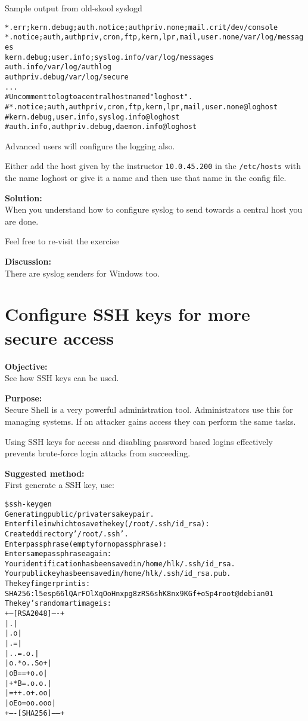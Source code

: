 \documentclass[a4paper,11pt,notitlepage]{report}
\begin{document}
Sample output from old-skool syslogd
\begin{alltt}
\small
*.err;kern.debug;auth.notice;authpriv.none;mail.crit    /dev/console
*.notice;auth,authpriv,cron,ftp,kern,lpr,mail,user.none /var/log/messages
kern.debug;user.info;syslog.info                        /var/log/messages
auth.info                                               /var/log/authlog
authpriv.debug                                          /var/log/secure
...
# Uncomment to log to a central host named "loghost".
#*.notice;auth,authpriv,cron,ftp,kern,lpr,mail,user.none        @loghost
#kern.debug,user.info,syslog.info                               @loghost
#auth.info,authpriv.debug,daemon.info                           @loghost
\end{alltt}

Advanced users will configure the logging also.

Either add the host given by the instructor \verb+10.0.45.200+ in the \verb+/etc/hosts+ with the name loghost or give it a name and then use that name in the config file.


{\bf Solution:}\\
When you understand how to configure syslog to send towards a central host you are done.

Feel free to re-visit the exercise 

{\bf Discussion:}\\
There are syslog senders for Windows too.


\chapter{Configure SSH keys for more secure access}
\label{ex:config-ssh-keys}

{\bf Objective:}\\
See how SSH keys can be used.

{\bf Purpose:}\\
Secure Shell is a very powerful administration tool. Administrators use this for managing systems. If an attacker gains access they can perform the same tasks.

Using SSH keys for access and disabling password based logins effectively prevents brute-force login attacks from succeeding.

{\bf Suggested method:}\\
First generate a SSH key, use:

\begin{alltt}
\$ ssh-keygen
Generating public/private rsa key pair.
Enter file in which to save the key (/root/.ssh/id_rsa):
Created directory '/root/.ssh'.
Enter passphrase (empty for no passphrase):
Enter same passphrase again:
Your identification has been saved in /home/hlk/.ssh/id_rsa.
Your public key has been saved in /home/hlk/.ssh/id_rsa.pub.
The key fingerprint is:
SHA256:l5esp66lQArFOlXqOoHnxpg8zRS6shK8nx9KGf+oSp4 root@debian01
The key's randomart image is:
+---[RSA 2048]----+
|      .          |
|   . o           |
|   .=            |
| ..=.      o .   |
|o.*o. . S o +    |
|oB==+o   . o     |
|+*B=.o.   o .    |
|=++.o +. o o     |
|oEo=oo .ooo      |
+----[SHA256]-----+
\end{alltt}
\end{document}
